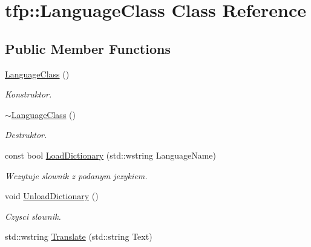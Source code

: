 \hypertarget{classtfp_1_1_language_class}{}\section{tfp\+:\+:Language\+Class Class Reference}
\label{classtfp_1_1_language_class}
\subsection*{Public Member Functions}
\begin{DoxyCompactItemize}
\item 
\mbox{\label{classtfp_1_1_language_class_a5a6dd7ce51ed41085050e7b8585ba90b}} 
\mbox{\hyperlink{classtfp_1_1_language_class_a5a6dd7ce51ed41085050e7b8585ba90b}{Language\+Class}} ()
\begin{DoxyCompactList}\small\item\em Konstruktor. \end{DoxyCompactList}\item 
\mbox{\label{classtfp_1_1_language_class_af9d0fd80a4f1fbcf56e8173e5523004e}} 
\mbox{\hyperlink{classtfp_1_1_language_class_af9d0fd80a4f1fbcf56e8173e5523004e}{$\sim$\+Language\+Class}} ()
\begin{DoxyCompactList}\small\item\em Destruktor. \end{DoxyCompactList}\item 
const bool \mbox{\hyperlink{classtfp_1_1_language_class_af3f9a79c6d043fd46eeef94a9730e036}{Load\+Dictionary}} (std\+::wstring Language\+Name)
\begin{DoxyCompactList}\small\item\em Wczytuje slownik z podanym jezykiem. \end{DoxyCompactList}\item 
\mbox{\label{classtfp_1_1_language_class_af6d22dd6351b06abb899f1b24e1ab72c}} 
void \mbox{\hyperlink{classtfp_1_1_language_class_af6d22dd6351b06abb899f1b24e1ab72c}{Unload\+Dictionary}} ()
\begin{DoxyCompactList}\small\item\em Czysci slownik. \end{DoxyCompactList}\item 
std\+::wstring \mbox{\hyperlink{classtfp_1_1_language_class_a8b0c58a37384663539c7ef40388521c1}{Translate}} (std\+::string Text)

\end{DoxyCompactItemize}
